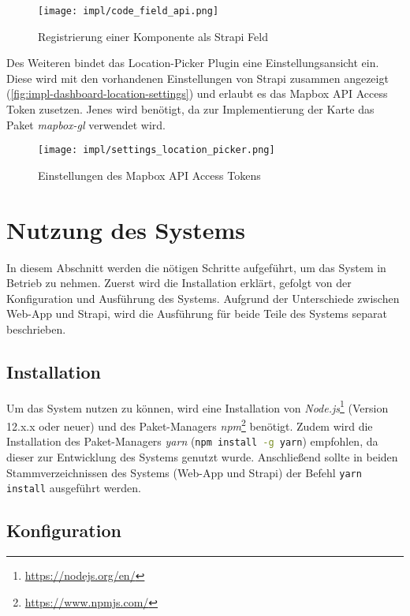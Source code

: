 \begin{figure}[htpb]
    \centering
    \texttt{[image: impl/code\_field\_api.png]}
    \caption{Registrierung einer Komponente als Strapi Feld}
    \label{fig:impl-dashboard-location-code}
\end{figure}

Des Weiteren bindet das Location-Picker Plugin eine Einstellungsansicht ein.
Diese wird mit den vorhandenen Einstellungen von Strapi zusammen angezeigt (\autoref{fig:impl-dashboard-location-settings}) und erlaubt es das Mapbox API
Access Token zusetzen. Jenes wird benötigt, da zur Implementierung der Karte das
Paket \textit{mapbox-gl} verwendet wird.

\begin{figure}[htpb]
    \centering
    \texttt{[image: impl/settings\_location\_picker.png]}
    \caption{Einstellungen des Mapbox API Access Tokens}
    \label{fig:impl-dashboard-location-settings}
\end{figure}


\section{Nutzung des Systems}

In diesem Abschnitt werden die nötigen Schritte aufgeführt, um das System in
Betrieb zu nehmen. Zuerst wird die Installation erklärt, gefolgt von der
Konfiguration und Ausführung des Systems. Aufgrund der Unterschiede zwischen
Web-App und Strapi, wird die Ausführung für beide Teile des Systems separat
beschrieben.

\subsection{Installation}

Um das System nutzen zu können, wird eine Installation von
\textit{Node.js}\footnote{\url{https://nodejs.org/en/}} (Version 12.x.x oder
neuer) und des Paket-Managers
\textit{npm}\footnote{\url{https://www.npmjs.com/}} benötigt. Zudem wird die
Installation des Paket-Managers \textit{yarn} (\lstinline[style=code,
language=bash, style=inline]{npm install -g yarn}) empfohlen, da dieser zur
Entwicklung des Systems genutzt wurde. Anschließend sollte in beiden
Stammverzeichnissen des Systems (Web-App und Strapi) der Befehl
\lstinline[style=code, language=bash, style=inline]{yarn install} ausgeführt
werden.

\subsection{Konfiguration}

